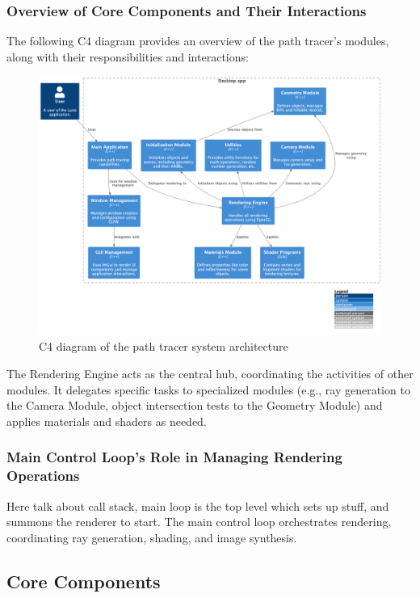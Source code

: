 \documentclass[12pt]{article}
\begin{document}
\subsubsection{Overview of Core Components and Their Interactions}

The following C4 diagram provides an overview of the path tracer's modules, along with their responsibilities and interactions:

\begin{figure}[H]
    \centering
    \includegraphics[width=\textwidth]{images/lumi_pml.png}
    \caption{C4 diagram of the path tracer system architecture}
    \label{fig:c4-diagram}
\end{figure}

The Rendering Engine acts as the central hub, coordinating the activities of other modules. It delegates specific tasks to specialized modules (e.g., ray generation to the Camera Module, object intersection tests to the Geometry Module) and applies materials and shaders as needed.

\subsubsection{Main Control Loop's Role in Managing Rendering Operations}
Here talk about call stack, main loop is the top level which sets up stuff, and summons the renderer to start.
The main control loop orchestrates rendering, coordinating ray generation, shading, and image synthesis.

\subsection{Core Components}
\end{document}
